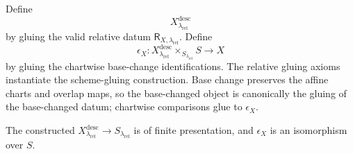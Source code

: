 \begin{definition}
  \label{def:nagata-finite-presentation-descent}

  Define
  \[
    X^{\mathrm{desc}}_{\lambda_{\mathrm{rel}}}
  \]
  by gluing the valid relative datum
  $\mathsf R_{X,\lambda_{\mathrm{rel}}}$.  Define
  \[
    \epsilon_X\colon
      X^{\mathrm{desc}}_{\lambda_{\mathrm{rel}}}
        \times_{S_{\lambda_{\mathrm{rel}}}}S
      \longrightarrow X
  \]
  by gluing the chartwise base-change identifications.
  The relative gluing axioms instantiate the scheme-gluing construction. Base
  change preserves the affine charts and overlap maps, so the base-changed
  object is canonically the gluing of the base-changed datum; chartwise
  comparisons glue to $\epsilon_X$.
\end{definition}

\begin{lemma}
  \label{lemma:nagata-finite-presentation-descends}
  \leanok

  The constructed
  $X^{\mathrm{desc}}_{\lambda_{\mathrm{rel}}}\to
  S_{\lambda_{\mathrm{rel}}}$ is of finite presentation, and
  $\epsilon_X$ is an isomorphism over $S$.
\end{lemma}

